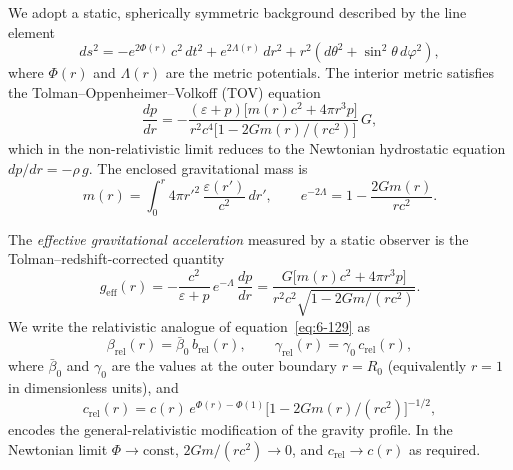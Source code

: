 We adopt a static, spherically symmetric background described by the
line element
\begin{equation}\label{eq:rel-60-1}
ds^{2} = -e^{2\Phi(r)}\,c^{2}\,dt^{2}
         + e^{2\Lambda(r)}\,dr^{2}
         + r^{2}(d\theta^{2}+\sin^{2}\!\theta\,d\varphi^{2}),
\end{equation}
where $\Phi(r)$ and $\Lambda(r)$ are the metric potentials.  The
interior metric satisfies the Tolman--Oppenheimer--Volkoff (TOV)
equation
\begin{equation}\label{eq:rel-60-2}
\frac{dp}{dr} = -\frac{(\varepsilon + p)\bigl[m(r)c^{2}
  + 4\pi r^{3}p\bigr]}{r^{2}c^{4}\bigl[1-2Gm(r)/(rc^{2})\bigr]}\,G,
\end{equation}
which in the non-relativistic limit reduces to the Newtonian
hydrostatic equation $dp/dr = -\rho\,g$.  The enclosed gravitational
mass is
\begin{equation}\label{eq:rel-60-3}
m(r) = \int_{0}^{r} 4\pi r'^{2}\,\frac{\varepsilon(r')}{c^{2}}\,dr',
\qquad
e^{-2\Lambda} = 1-\frac{2Gm(r)}{rc^{2}}.
\end{equation}

The \emph{effective gravitational acceleration} measured by a static
observer is the Tolman--redshift-corrected quantity
\begin{equation}\label{eq:rel-60-4}
g_{\mathrm{eff}}(r) = -\frac{c^{2}}{\varepsilon+p}\,e^{-\Lambda}\,\frac{dp}{dr}
  = \frac{G\bigl[m(r)c^{2}+4\pi r^{3}p\bigr]}
        {r^{2}c^{2}\sqrt{1-2Gm/(rc^{2})}}.
\end{equation}
We write the relativistic analogue of equation~\eqref{eq:6-129} as
\begin{equation}\label{eq:rel-60-5}
\beta_{\mathrm{rel}}(r) = \bar{\beta}_{0}\,b_{\mathrm{rel}}(r),
\qquad
\gamma_{\mathrm{rel}}(r)= \gamma_{0}\,c_{\mathrm{rel}}(r),
\end{equation}
where $\bar{\beta}_{0}$ and $\gamma_{0}$ are the values at the outer
boundary $r=R_0$ (equivalently $r=1$ in dimensionless units), and
\begin{equation}\label{eq:rel-60-6}
c_{\mathrm{rel}}(r) = c(r)\,e^{\Phi(r)-\Phi(1)}
  \bigl[1-2Gm(r)/(rc^{2})\bigr]^{-1/2},
\end{equation}
encodes the general-relativistic modification of the gravity profile.
In the Newtonian limit $\Phi\to\text{const}$,
$2Gm/(rc^{2})\to 0$, and $c_{\mathrm{rel}}\to c(r)$ as required.

